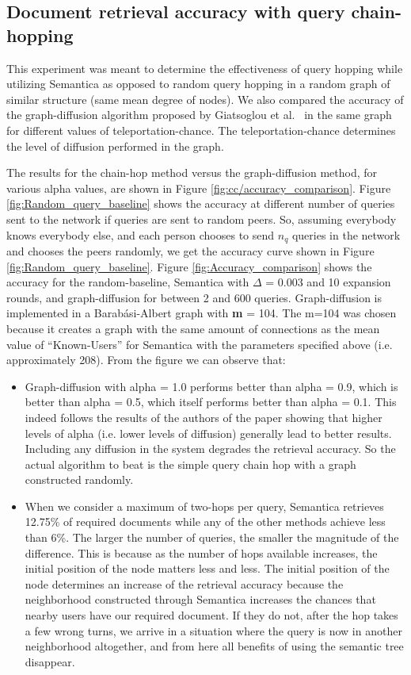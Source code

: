 \documentclass[10pt,journal]{IEEEtran}
\begin{document}
\subsection{Document retrieval accuracy with query chain-hopping}
This experiment was meant to determine the effectiveness of query hopping while utilizing Semantica as opposed to random query hopping in a random graph of similar structure (same mean degree of nodes). We also compared the accuracy of the graph-diffusion algorithm proposed by Giatsoglou et al.~\cite{giatsoglou2022graph} in the same graph for different values of teleportation-chance. The teleportation-chance determines the level of diffusion performed in the graph.

The results for the chain-hop method versus the graph-diffusion method, for various alpha values, are shown in Figure \ref{fig:cc/accuracy_comparison}. Figure \ref{fig:Random_query_baseline} shows the accuracy at different number of queries sent to the network if queries are sent to random peers. So, assuming everybody knows everybody else, and each person chooses to send $n_q$ queries in the network and chooses the peers randomly, we get the accuracy curve shown in Figure \ref{fig:Random_query_baseline}.
Figure \ref{fig:Accuracy_comparison} shows the accuracy for the random-baseline, Semantica with $\Delta$ = 0.003 and 10 expansion rounds, and graph-diffusion for between 2 and 600 queries. Graph-diffusion is implemented in a Barabási-Albert graph with \textbf{m} = 104. The m=104 was chosen because it creates a graph with the same amount of connections as the mean value of ``Known-Users'' for Semantica with the parameters specified above (i.e. approximately 208).
%
From the figure we can observe that:
\begin{itemize}
    \item Graph-diffusion with alpha = 1.0 performs better than alpha = 0.9, which is better than alpha = 0.5, which itself performs better than alpha = 0.1. This indeed follows the results of the authors of the paper showing that higher levels of alpha (i.e. lower levels of diffusion) generally lead to better results. Including any diffusion in the system degrades the retrieval accuracy. So the actual algorithm to beat is the simple query chain hop with a graph constructed randomly.
    \item  When we consider a maximum of two-hops per query, Semantica retrieves 12.75\% of required documents while any of the other methods achieve less than 6\%. The larger the number of queries, the smaller the magnitude of the difference. This is because as the number of hops available increases, the initial position of the node matters less and less. The initial position of the node determines an increase of the retrieval accuracy because the neighborhood constructed through Semantica increases the chances that nearby users have our required document. If they do not, after the hop takes a few wrong turns, we arrive in a situation where the query is now in another neighborhood altogether, and from here all benefits of using the semantic tree disappear. 
\end{itemize}
\end{document}
